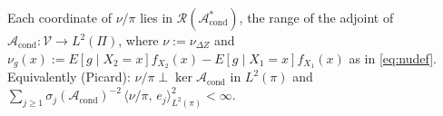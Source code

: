 %


\begin{assumption}\label{ass:sourcecond}
Each coordinate of $\nu/\pi$ lies in $\mathcal R(\mathcal A^\ast_{\mathrm{cond}})$, the range of the
adjoint of $\mathcal A_{\mathrm{cond}}:\mathcal V\to L^{2}(\Pi)$, where $\nu:=\nu_{\Delta Z}$ and
$\nu_g(x):=E[g\mid X_2=x]f_{X_2}(x)-E[g\mid X_1=x]f_{X_1}(x)$ as in \eqref{eq:nudef}. Equivalently
(Picard):
$\nu/\pi\perp\ker\mathcal A_{\mathrm{cond}}$ in $L^{2}(\pi)$ and
$\sum_{j\ge1}\sigma_j(\mathcal A_{\mathrm{cond}})^{-2}\,\langle\nu/\pi,\,e_j\rangle_{L^{2}(\pi)}^{2}<\infty$.
\end{assumption}


